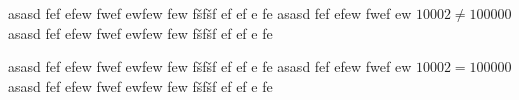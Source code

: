 \documentclass[12pt]{article}
\begin{document}
asasd fef efew fwef ewfew few fšfšf ef ef e fe
asasd fef efew fwef ew
$10002\neq100000$
asasd fef efew fwef ewfew few fšfšf ef ef e fe

asasd fef efew fwef ewfew few fšfšf ef ef e fe
asasd fef efew fwef ew
$10002=100000$
asasd fef efew fwef ewfew few fšfšf ef ef e fe
\end{document}

